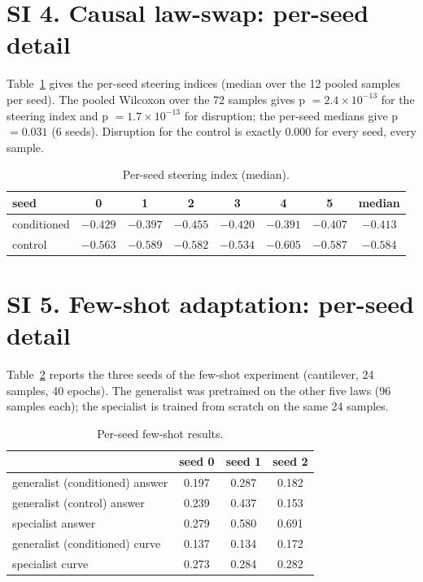 \documentclass[11pt,a4paper]{article}
\begin{document}
\section*{SI 4. Causal law-swap: per-seed detail}
\label{si:lawswap}

Table~\ref{tab:si4} gives the per-seed steering indices (median over the 12
pooled samples per seed). The pooled Wilcoxon over the 72 samples gives
p $= 2.4\times10^{-13}$ for the steering index and
p $= 1.7\times10^{-13}$ for disruption; the per-seed medians give p $= 0.031$
(6 seeds). Disruption for the control is exactly 0.000 for every seed, every
sample.

\begin{table}[h]
\centering
\caption{Per-seed steering index (median).}
\label{tab:si4}
\small
\begin{tabular}{@{}lccccccc@{}}
\toprule
seed & 0 & 1 & 2 & 3 & 4 & 5 & median \\
\midrule
conditioned & $-0.429$ & $-0.397$ & $-0.455$ & $-0.420$ & $-0.391$ & $-0.407$ & $-0.413$ \\
control & $-0.563$ & $-0.589$ & $-0.582$ & $-0.534$ & $-0.605$ & $-0.587$ & $-0.584$ \\
\bottomrule
\end{tabular}
\end{table}

\section*{SI 5. Few-shot adaptation: per-seed detail}
\label{si:fewshot}

Table~\ref{tab:si5} reports the three seeds of the few-shot experiment
(cantilever, 24 samples, 40 epochs). The generalist was pretrained on the
other five laws (96 samples each); the specialist is trained from scratch on
the same 24 samples.

\begin{table}[h]
\centering
\caption{Per-seed few-shot results.}
\label{tab:si5}
\small
\begin{tabular}{@{}lccc@{}}
\toprule
 & seed 0 & seed 1 & seed 2 \\
\midrule
generalist (conditioned) answer & 0.197 & 0.287 & 0.182 \\
generalist (control) answer & 0.239 & 0.437 & 0.153 \\
specialist answer & 0.279 & 0.580 & 0.691 \\
\midrule
generalist (conditioned) curve & 0.137 & 0.134 & 0.172 \\
specialist curve & 0.273 & 0.284 & 0.282 \\
\bottomrule
\end{tabular}
\end{table}
\end{document}
